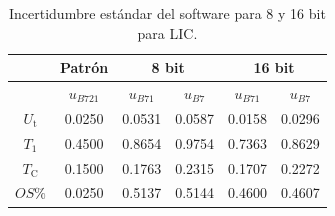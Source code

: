 \begin{table}[H]
    \centering
    \begin{tabular}{@{}cccccc@{}}
        \toprule
                              & \textbf{Patrón}     & \multicolumn{2}{c}{\textbf{8 bit}}     & \multicolumn{2}{c}{\textbf{16 bit}}    \\ \midrule
                              & \textbf{$u_{B721}$} & \textbf{$u_{B71}$} & \textbf{$u_{B7}$} & \textbf{$u_{B71}$} & \textbf{$u_{B7}$} \\ \midrule
        \textbf{$U_\text{t}$} & 0.0250              & 0.0531             & 0.0587            & 0.0158             & 0.0296            \\ \midrule
        \textbf{$T_1$}        & 0.4500              & 0.8654             & 0.9754            & 0.7363             & 0.8629            \\ \midrule
        \textbf{$T_\text{C}$} & 0.1500              & 0.1763             & 0.2315            & 0.1707             & 0.2272            \\ \midrule
        \textbf{$OS\%$}       & 0.0250              & 0.5137             & 0.5144            & 0.4600             & 0.4607            \\ \bottomrule
        \end{tabular}
    \caption{Incertidumbre estándar del software para 8 y 16 bit para LIC.}
    \label{tab:incertidumbre_software_lic}
\end{table}
